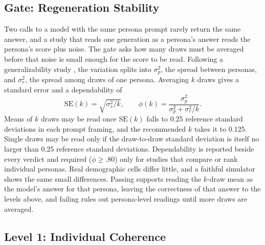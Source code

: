 \subsection{Gate: Regeneration Stability}
\label{sec:gate-method}

Two calls to a model with the same persona prompt rarely return the same answer, and a study that reads one generation as a persona's answer reads the persona's score plus noise.
The gate asks how many draws must be averaged before that noise is small enough for the score to be read.
Following a generalizability study \citep{cronbach1972dependability,brennan2001gtheory}, the variation splits into $\sigma^2_p$, the spread between personas, and $\sigma^2_r$, the spread among draws of one persona.
Averaging $k$ draws gives a standard error and a dependability of
\begin{equation}
\mathrm{SE}(k) = \sqrt{\sigma^2_r / k}, \qquad \phi(k) = \frac{\sigma^2_p}{\sigma^2_p + \sigma^2_r / k}.
\label{eq:phi}
\end{equation}
Means of $k$ draws may be read once $\mathrm{SE}(k)$ falls to 0.25 reference standard deviations in each prompt framing, and the recommended $k$ takes it to 0.125.
Single draws may be read only if the draw-to-draw standard deviation is itself no larger than 0.25 reference standard deviations.
Dependability is reported beside every verdict and required ($\phi \ge .80$) only for studies that compare or rank individual personas.
Real demographic cells differ little, and a faithful simulator shows the same small differences.
Passing supports reading the $k$-draw mean as the model's answer for that persona, leaving the correctness of that answer to the levels above, and failing rules out persona-level readings until more draws are averaged.

\subsection{Level 1: Individual Coherence}
\label{sec:l1-method}

